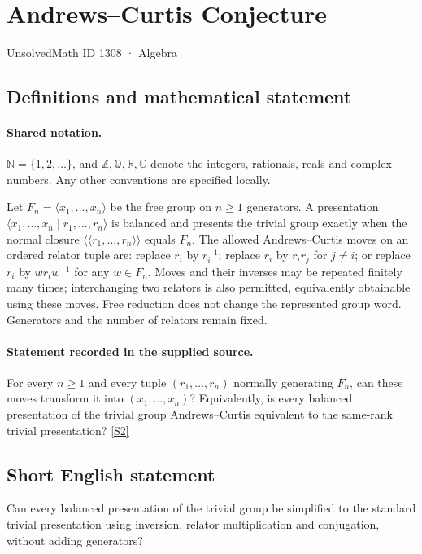 \documentclass[11pt]{article}
\newcommand{\sref}[2]{\hyperlink{source:#1:#2}{[S#2]}}
\begin{document}
\setcounter{section}{1307}
\section{Andrews–Curtis Conjecture}\label{1308}
{\small\sffamily UnsolvedMath ID 1308 · Algebra}
\subsection{Definitions and mathematical statement}

\paragraph{Shared notation.}$\mathbb N=\{1,2,\ldots\}$, and $\mathbb Z,\mathbb Q,\mathbb R,\mathbb C$ denote the integers, rationals, reals and complex numbers. Any other conventions are specified locally.


Let $F_n=\langle x_1,\ldots,x_n\rangle$ be the free group on $n\geq1$ generators. A presentation $\langle x_1,\ldots,x_n\mid r_1,\ldots,r_n\rangle$ is balanced and presents the trivial group exactly when the normal closure $\langle\!\langle r_1,\ldots,r_n\rangle\!\rangle$ equals $F_n$. The allowed Andrews--Curtis moves on an ordered relator tuple are: replace $r_i$ by $r_i^{-1}$; replace $r_i$ by $r_ir_j$ for $j\ne i$; or replace $r_i$ by $wr_iw^{-1}$ for any $w\in F_n$. Moves and their inverses may be repeated finitely many times; interchanging two relators is also permitted, equivalently obtainable using these moves. Free reduction does not change the represented group word. Generators and the number of relators remain fixed.
\paragraph{Statement recorded in the supplied source.}
For every $n\geq1$ and every tuple $(r_1,\ldots,r_n)$ normally generating $F_n$, can these moves transform it into $(x_1,\ldots,x_n)$? Equivalently, is every balanced presentation of the trivial group Andrews--Curtis equivalent to the same-rank trivial presentation? \sref{1308}{2}

\subsection{Short English statement}
Can every balanced presentation of the trivial group be simplified to the standard trivial presentation using inversion, relator multiplication and conjugation, without adding generators?
\end{document}
